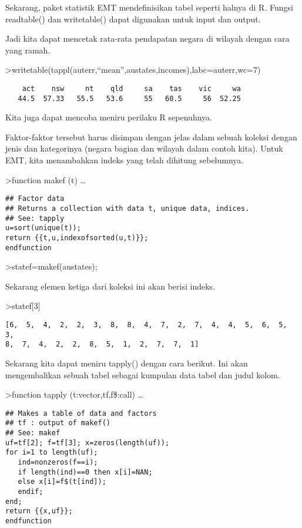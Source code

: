 \documentclass[
]{book}
\begin{document}
Sekarang, paket statistik EMT mendefinisikan tabel seperti halnya di R. Fungsi readtable() dan writetable() dapat digunakan untuk input dan output.

Jadi kita dapat mencetak rata-rata pendapatan negara di wilayah dengan cara yang ramah.

\textgreater writetable(tappl(auterr,``mean'',austates,incomes),labc=auterr,wc=7)

\begin{verbatim}
    act    nsw     nt    qld     sa    tas    vic     wa
   44.5  57.33   55.5   53.6     55   60.5     56  52.25
\end{verbatim}

Kita juga dapat mencoba meniru perilaku R sepenuhnya.

Faktor-faktor tersebut harus disimpan dengan jelas dalam sebuah koleksi dengan jenis dan kategorinya (negara bagian dan wilayah dalam contoh kita). Untuk EMT, kita menambahkan indeks yang telah dihitung sebelumnya.

\textgreater function makef (t) \ldots{}

\begin{verbatim}
## Factor data
## Returns a collection with data t, unique data, indices.
## See: tapply
u=sort(unique(t));
return {{t,u,indexofsorted(u,t)}};
endfunction
\end{verbatim}

\textgreater statef=makef(austates);

Sekarang elemen ketiga dari koleksi ini akan berisi indeks.

\textgreater statef{[}3{]}

\begin{verbatim}
[6,  5,  4,  2,  2,  3,  8,  8,  4,  7,  2,  7,  4,  4,  5,  6,  5,  3,
8,  7,  4,  2,  2,  8,  5,  1,  2,  7,  7,  1]
\end{verbatim}

Sekarang kita dapat meniru tapply() dengan cara berikut. Ini akan mengembalikan sebuah tabel sebagai kumpulan data tabel dan judul kolom.

\textgreater function tapply (t:vector,tf,f\$:call) \ldots{}

\begin{verbatim}
## Makes a table of data and factors
## tf : output of makef()
## See: makef
uf=tf[2]; f=tf[3]; x=zeros(length(uf));
for i=1 to length(uf);
   ind=nonzeros(f==i);
   if length(ind)==0 then x[i]=NAN;
   else x[i]=f$(t[ind]);
   endif;
end;
return {{x,uf}};
endfunction
\end{verbatim}
\end{document}
